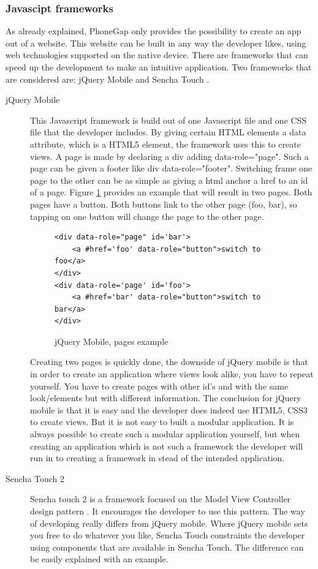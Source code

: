 \subsubsection*{Javascipt frameworks}
As already explained, PhoneGap only provides the possibility to create an app out of a website. This website can be built in any way the developer likes, using web technologies supported on the native device. There are frameworks that can speed up the development to make an intuitive application. Two frameworks that are considered are: jQuery Mobile \cite{jQuery-Mobile} and  Sencha Touch \cite{sencha}. 
\begin{description}
\item [jQuery Mobile]
This Javascript framework is build out of one Javascript file and one CSS file that the developer includes. By giving certain HTML elements a data attribute, which is a HTML5 element, the framework uses this to create views. A page is made by declaring a div adding data-role="page". Such a page can be given a footer like div data-role="footer". 
Switching frame one page to the other can be as simple as giving a html anchor a href to an id of a page. Figure \ref{fig:jquery} provides an example that will result in two pages. Both pages have a button. Both buttons link to the other page (foo, bar), so tapping on one button will change the page to the other page.
\begin{figure}[H]
\begin{lstlisting}
<div data-role="page" id='bar'>
	<a #href='foo' data-role="button">switch to foo</a>
</div>
<div data-role='page' id='foo'>
	<a #href='bar' data-role="button">switch to bar</a>
</div>
\end{lstlisting}
\caption{jQuery Mobile, pages example}
\label{fig:jquery}
\end{figure}

Creating two pages is quickly done, the downside of jQuery mobile is that in order to create an application where views look alike, you have to repeat yourself. You have to create pages with other id's and with the same look/elements but with different information. The conclusion for jQuery mobile is that it is easy and the developer does indeed use HTML5, CSS3 to create views.  But it is not easy to built a modular application. It is always possible to create such a modular application yourself, but when creating an application which is not such a framework the developer will run in to creating a framework in stead of the intended application.

\item [Sencha Touch 2]
Sencha touch 2 is a framework focused on the Model View Controller design pattern \cite{MVC}. It encourages the developer to use this pattern. The way of developing really differs from jQuery mobile. Where jQuery mobile sets you free to do whatever you like, Sencha Touch constraints the developer using components that are available in Sencha Touch. The difference can be easily explained with an example.


\end{description}

